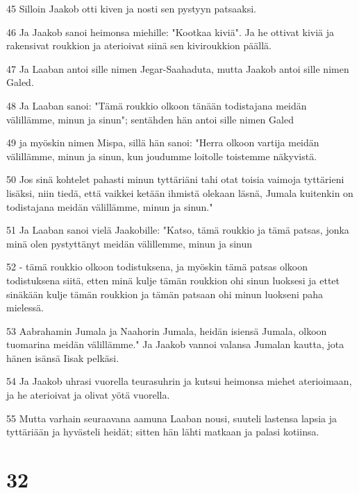 \par 45 Silloin Jaakob otti kiven ja nosti sen pystyyn patsaaksi.
\par 46 Ja Jaakob sanoi heimonsa miehille: "Kootkaa kiviä". Ja he ottivat kiviä ja rakensivat roukkion ja aterioivat siinä sen kiviroukkion päällä.
\par 47 Ja Laaban antoi sille nimen Jegar-Saahaduta, mutta Jaakob antoi sille nimen Galed.
\par 48 Ja Laaban sanoi: "Tämä roukkio olkoon tänään todistajana meidän välillämme, minun ja sinun"; sentähden hän antoi sille nimen Galed
\par 49 ja myöskin nimen Mispa, sillä hän sanoi: "Herra olkoon vartija meidän välillämme, minun ja sinun, kun joudumme loitolle toistemme näkyvistä.
\par 50 Jos sinä kohtelet pahasti minun tyttäriäni tahi otat toisia vaimoja tyttärieni lisäksi, niin tiedä, että vaikkei ketään ihmistä olekaan läsnä, Jumala kuitenkin on todistajana meidän välillämme, minun ja sinun."
\par 51 Ja Laaban sanoi vielä Jaakobille: "Katso, tämä roukkio ja tämä patsas, jonka minä olen pystyttänyt meidän välillemme, minun ja sinun
\par 52 - tämä roukkio olkoon todistuksena, ja myöskin tämä patsas olkoon todistuksena siitä, etten minä kulje tämän roukkion ohi sinun luoksesi ja ettet sinäkään kulje tämän roukkion ja tämän patsaan ohi minun luokseni paha mielessä.
\par 53 Aabrahamin Jumala ja Naahorin Jumala, heidän isiensä Jumala, olkoon tuomarina meidän välillämme." Ja Jaakob vannoi valansa Jumalan kautta, jota hänen isänsä Iisak pelkäsi.
\par 54 Ja Jaakob uhrasi vuorella teurasuhrin ja kutsui heimonsa miehet aterioimaan, ja he aterioivat ja olivat yötä vuorella.
\par 55 Mutta varhain seuraavana aamuna Laaban nousi, suuteli lastensa lapsia ja tyttäriään ja hyvästeli heidät; sitten hän lähti matkaan ja palasi kotiinsa.

\chapter{32}

